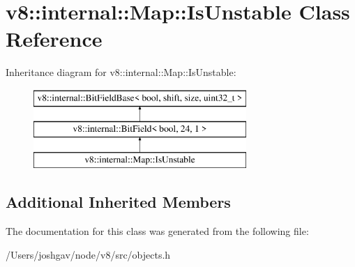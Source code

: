 \hypertarget{classv8_1_1internal_1_1_map_1_1_is_unstable}{}\section{v8\+:\+:internal\+:\+:Map\+:\+:Is\+Unstable Class Reference}
\label{classv8_1_1internal_1_1_map_1_1_is_unstable}
Inheritance diagram for v8\+:\+:internal\+:\+:Map\+:\+:Is\+Unstable\+:\begin{figure}[H]
\begin{center}
\leavevmode
\includegraphics[height=3.000000cm]{classv8_1_1internal_1_1_map_1_1_is_unstable}
\end{center}
\end{figure}
\subsection*{Additional Inherited Members}


The documentation for this class was generated from the following file\+:\begin{DoxyCompactItemize}
\item 
/\+Users/joshgav/node/v8/src/objects.\+h\end{DoxyCompactItemize}

